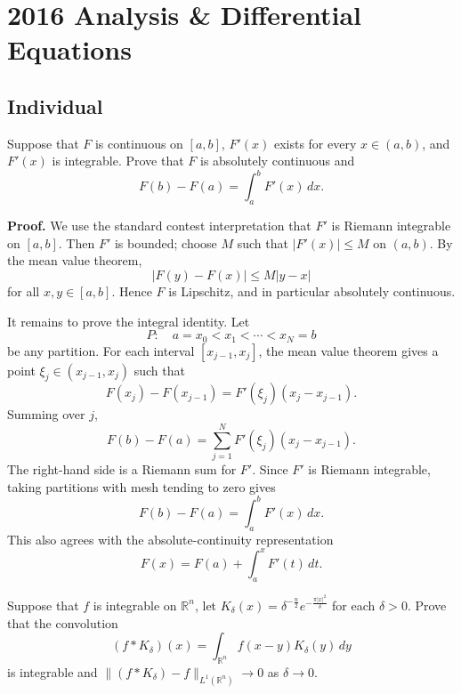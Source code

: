 \section{2016 Analysis \& Differential Equations}

\subsection{Individual}

\begin{exercise}
\label{analysis:2016:1}
Suppose that $F$ is continuous on $[a,b]$, $F'(x)$ exists for every $x\in(a,b)$, and $F'(x)$ is integrable. Prove that $F$ is absolutely continuous and
\[
F(b) - F(a) = \int_a^b F'(x)\,dx.
\]
\end{exercise}

\begin{solution}
\textbf{Proof.}
We use the standard contest interpretation that $F'$ is Riemann integrable on $[a,b]$. Then $F'$ is bounded; choose $M$ such that $|F'(x)|\leq M$ on $(a,b)$. By the mean value theorem,
\[
|F(y)-F(x)|\leq M|y-x|
\]
for all $x,y\in[a,b]$. Hence $F$ is Lipschitz, and in particular absolutely continuous.

It remains to prove the integral identity. Let
\[
P:\quad a=x_0<x_1<\cdots <x_N=b
\]
be any partition. For each interval $[x_{j-1},x_j]$, the mean value theorem gives a point $\xi_j\in(x_{j-1},x_j)$ such that
\[
F(x_j)-F(x_{j-1})=F'(\xi_j)(x_j-x_{j-1}).
\]
Summing over $j$,
\[
F(b)-F(a)=\sum_{j=1}^N F'(\xi_j)(x_j-x_{j-1}).
\]
The right-hand side is a Riemann sum for $F'$. Since $F'$ is Riemann integrable, taking partitions with mesh tending to zero gives
\[
F(b)-F(a)=\int_a^b F'(x)\,dx.
\]
This also agrees with the absolute-continuity representation
\[
F(x)=F(a)+\int_a^x F'(t)\,dt.
\]
\end{solution}

\begin{exercise}
\label{analysis:2016:2}
Suppose that $f$ is integrable on $\mathbb{R}^n$, let $K_{\delta}(x) = \delta^{-\frac{n}{2}}e^{-\frac{\pi|x|^2}{\delta}}$ for each $\delta>0$. Prove that the convolution
\[
(f*K_{\delta})(x) = \int_{\mathbb{R}^n} f(x-y)K_{\delta}(y)\,dy
\]
is integrable and $\| (f*K_{\delta}) - f\|_{L^1(\mathbb{R}^n)} \to 0$ as $\delta\to 0$.
\end{exercise}

